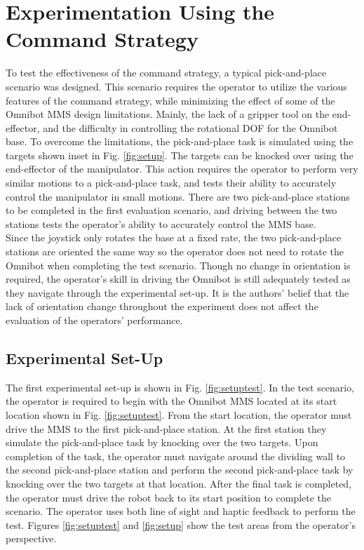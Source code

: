 \documentclass[onecolumn,10pt,final]{asme2ej}
\begin{document}
\section{Experimentation Using the Command Strategy}
\label{sec:results}
To test the effectiveness of the command strategy, a typical pick-and-place scenario was designed. This scenario requires the operator to utilize the various features of the command strategy, while minimizing the effect of some of the Omnibot MMS design limitations. Mainly, the lack of a gripper tool on the end-effector, and the difficulty in controlling the rotational DOF for the Omnibot base. To overcome the limitations, the pick-and-place task is simulated using the targets shown inset in Fig. \ref{fig:setup}. The targets can be knocked over using the end-effector of the manipulator. This action requires the operator to perform very similar motions to a pick-and-place task, and tests their ability to accurately control the manipulator in small motions. There are two pick-and-place stations to be completed in the first evaluation scenario, and driving between the two stations tests the operator's ability to accurately control the MMS base.\\

Since the joystick only rotates the base at a fixed rate, the two pick-and-place stations are oriented the same way so the operator does not need to rotate the Omnibot when completing the test scenario. Though no change in orientation is required, the operator's skill in driving the Omnibot is still adequately tested as they navigate through the experimental set-up. It is the authors' belief that the lack of orientation change throughout the experiment does not affect the evaluation of the operators' performance.\\


\subsection{Experimental Set-Up}

The first experimental set-up is shown in Fig. \ref{fig:setuptest}. In the test scenario, the operator is required to begin with the Omnibot MMS located at its start location shown in Fig. \ref{fig:setuptest}. From the start location, the operator must drive the MMS to the first pick-and-place station. At the first station they simulate the pick-and-place task by knocking over the two targets. Upon completion of the task, the operator must navigate around the dividing wall to the second pick-and-place station and perform the second pick-and-place task by knocking over the two targets at that location. After the final task is completed, the operator must drive the robot back to its start position to complete the scenario. The operator uses both line of sight and haptic feedback to perform the test. Figures \ref{fig:setuptest} and \ref{fig:setup} show the test areas from the operator's perspective.\\
\end{document}
